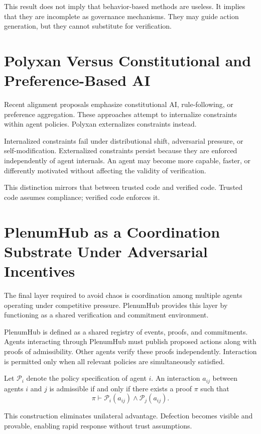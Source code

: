 \documentclass[11pt,oneside]{article}
\begin{document}
This result does not imply that behavior-based methods are useless. It implies that they are incomplete as governance mechanisms. They may guide action generation, but they cannot substitute for verification.

\section{Polyxan Versus Constitutional and Preference-Based AI}

Recent alignment proposals emphasize constitutional AI, rule-following, or preference aggregation. These approaches attempt to internalize constraints within agent policies. Polyxan externalizes constraints instead.

Internalized constraints fail under distributional shift, adversarial pressure, or self-modification. Externalized constraints persist because they are enforced independently of agent internals. An agent may become more capable, faster, or differently motivated without affecting the validity of verification.

This distinction mirrors that between trusted code and verified code. Trusted code assumes compliance; verified code enforces it.

\section{PlenumHub as a Coordination Substrate Under Adversarial Incentives}

The final layer required to avoid chaos is coordination among multiple agents operating under competitive pressure. PlenumHub provides this layer by functioning as a shared verification and commitment environment.

PlenumHub is defined as a shared registry of events, proofs, and commitments. Agents interacting through PlenumHub must publish proposed actions along with proofs of admissibility. Other agents verify these proofs independently. Interaction is permitted only when all relevant policies are simultaneously satisfied.

Let \( \mathcal{P}_i \) denote the policy specification of agent \( i \). An interaction \( a_{ij} \) between agents \( i \) and \( j \) is admissible if and only if there exists a proof \( \pi \) such that
\[
\pi \vdash \mathcal{P}_i(a_{ij}) \wedge \mathcal{P}_j(a_{ij}).
\]

This construction eliminates unilateral advantage. Defection becomes visible and provable, enabling rapid response without trust assumptions.
\end{document}
